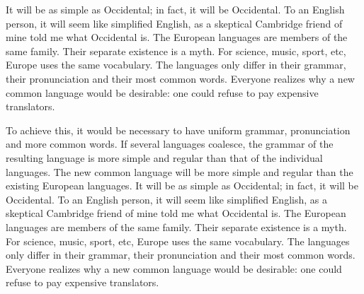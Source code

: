 It will be as simple as Occidental; in fact, it will be Occidental. To an English person, it will seem like simplified English, as a skeptical Cambridge friend of mine told me what Occidental is. The European languages are members of the same family. Their separate existence is a myth. For science, music, sport, etc, Europe uses the same vocabulary. The languages only differ in their grammar, their pronunciation and their most common words. Everyone realizes why a new common language would be desirable: one could refuse to pay expensive translators.

To achieve this, it would be necessary to have uniform grammar, pronunciation and more common words. If several languages coalesce, the grammar of the resulting language is more simple and regular than that of the individual languages. The new common language will be more simple and regular than the existing European languages. It will be as simple as Occidental; in fact, it will be Occidental. To an English person, it will seem like simplified English, as a skeptical Cambridge friend of mine told me what Occidental is. The European languages are members of the same family. Their separate existence is a myth. For science, music, sport, etc, Europe uses the same vocabulary. The languages only differ in their grammar, their pronunciation and their most common words. Everyone realizes why a new common language would be desirable: one could refuse to pay expensive translators.


